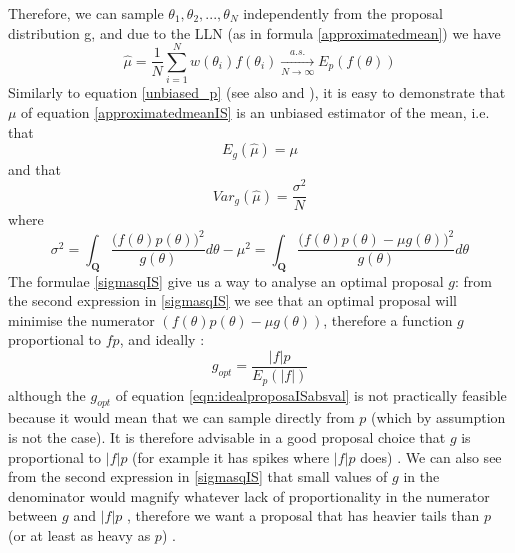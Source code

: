 \documentclass[12pt,mythesisstyle]{report}
\begin{document}
Therefore, we can sample $\theta_1,\theta_2,...,\theta_N$ independently from the proposal distribution g, and due to the LLN (as in formula \eqref{approximatedmean}) we have
\begin{equation}\label{approximatedmeanIS2}
\hat{\mu}=\frac{1}{N}\sum_{i=1}^{N}w(\theta_{i})f(\theta_{i}) \xrightarrow[N \to \infty]{a.s.} E_{p}(f(\theta))
\end{equation}
Similarly to equation \eqref{unbiased_p} (see also \cite{mcmcnotes} and \cite{OwenIS}), it is easy to demonstrate that $\mu$ of equation \eqref{approximatedmeanIS} is an unbiased estimator of the mean, i.e. that
\begin{equation}
E_g(\hat{\mu})=\mu
\end{equation}
and that \cite{OwenIS}
\begin{equation}\label{varianceIS}
Var_g(\hat{\mu})=\frac{\sigma^2}{N}
\end{equation}
where
\begin{equation}\label{sigmasqIS}
\sigma^2=\int_{\mathbf{Q}}\frac{\big(f(\theta)p(\theta)\big)^2}{g(\theta)}d\theta-\mu^2=\int_{\mathbf{Q}}\frac{\big(f(\theta)p(\theta)-\mu g(\theta)\big)^2}{g(\theta)}d\theta
\end{equation}
The formulae \eqref{sigmasqIS} give us a way to analyse an optimal proposal $g$: from the second expression in  \eqref{sigmasqIS} we see that an optimal proposal will minimise the numerator $(f(\theta)p(\theta)-\mu g(\theta))$, therefore a function $g$ proportional to $fp$, and ideally \cite{OwenIS}:
\begin{equation}\label{eqn:idealproposaISabsval}
g_{opt}=\frac{|f|p}{E_p(|f|)}
\end{equation}
although the $g_{opt}$ of equation \eqref{eqn:idealproposaISabsval} is not practically feasible because it would mean that we can sample directly from $p$ (which by assumption is not the case). It is therefore advisable in a good proposal choice that $g$ is proportional to $|f|p$ (for example it has spikes where $|f|p$ does) \cite{OwenIS}. We can also see from the second expression in \eqref{sigmasqIS} that small values of $g$ in the denominator would magnify whatever lack of proportionality in the numerator between $g$ and $|f|p$ \cite{OwenIS}, therefore we want a proposal that has heavier tails than $p$ (or at least as heavy as $p$) \cite{mcmcnotes}. 
\end{document}
